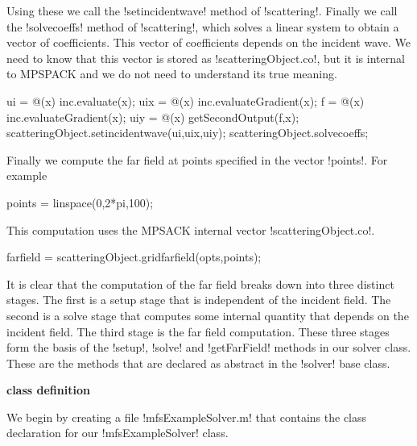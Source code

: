 \documentclass[12pt,letterpaper,final]{article}
\newcommand{\techheading}[1]{%
    \par\vspace{-0.3\parskip}\noindent\hspace{-1cm}\textbf{#1}%
    \par\vspace{-0.5\parskip}\noindent\nopagebreak\ignorespaces}
\begin{document}
Using these we call the !setincidentwave! method of !scattering!.
Finally we call the !solvecoeffs! method of !scattering!, which solves
a linear system to obtain a vector of coefficients.
This vector of coefficients depends on the incident wave.
We need to know that this vector is stored as !scatteringObject.co!,
but it is internal
to MPSPACK and we do not need to understand its true meaning.
\begin{matlab}
ui = @(x) inc.evaluate(x);
uix = @(x) inc.evaluateGradient(x);
f = @(x) inc.evaluateGradient(x);
uiy = @(x) getSecondOutput(f,x);
scatteringObject.setincidentwave(ui,uix,uiy);
scatteringObject.solvecoeffs;
\end{matlab}
Finally we compute the far field at points specified in the vector !points!.
For example
\begin{matlab}
points = linspace(0,2*pi,100);
\end{matlab}
This computation uses the MPSACK internal vector 
!scatteringObject.co!.
\begin{matlab}                
farfield = scatteringObject.gridfarfield(opts,points);
\end{matlab}
It is clear that the computation of the far field breaks down into three distinct stages.
The first is a setup stage that is independent of the incident field.
The second is a solve stage that computes some internal quantity that
depends on the incident field.
The third stage is the far field computation.
These three stages form the basis of the
!setup!, !solve! and !getFarField! methods in our solver class.
These are the methods that are declared as abstract in the !solver! base
class.

\techheading{class definition}
We begin by creating a file !mfsExampleSolver.m! that contains the class
declaration for our !mfsExampleSolver! class.
\end{document}
